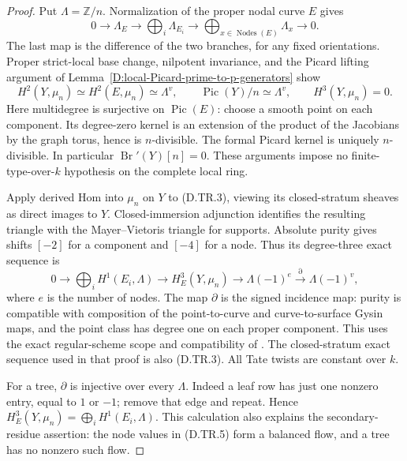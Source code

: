 \begin{proof}
Put $\Lambda=\mathbb Z/n$. Normalization of the proper
nodal curve $E$ gives
\[
 0\longrightarrow\Lambda_E\longrightarrow
   \bigoplus_i\Lambda_{E_i}\longrightarrow
   \bigoplus_{x\in\operatorname{Nodes}(E)}\Lambda_x
   \longrightarrow0.                                  \tag{D.TR.3}
\]
The last map is the difference of the two branches, for
any fixed orientations. Proper strict-local base change,
nilpotent invariance, and the Picard lifting argument of
Lemma~\ref{D:local-Picard-prime-to-p-generators} show
\[
 H^2(Y,\mu_n)\simeq H^2(E,\mu_n)\simeq\Lambda^v,
 \qquad \operatorname{Pic}(Y)/n\simeq\Lambda^v,
 \qquad H^3(Y,\mu_n)=0.                               \tag{D.TR.4}
\]
Here multidegree is surjective on $\operatorname{Pic}(E)$:
choose a smooth point on each component. Its degree-zero
kernel is an extension of the product of the Jacobians by
the graph torus, hence is $n$-divisible. The formal Picard
kernel is uniquely $n$-divisible. In particular
$\operatorname{Br}'(Y)[n]=0$. These arguments impose no
finite-type-over-$k$ hypothesis on the complete local ring.

Apply derived Hom into $\mu_n$ on $Y$ to (D.TR.3),
viewing its closed-stratum sheaves as direct images to $Y$.
Closed-immersion adjunction identifies the resulting
triangle with the Mayer--Vietoris triangle for supports.
Absolute purity gives shifts $[-2]$ for a component and
$[-4]$ for a node. Thus its degree-three exact sequence is
\[
 0\longrightarrow\bigoplus_i H^1(E_i,\Lambda)
 \longrightarrow H^3_E(Y,\mu_n)
 \longrightarrow\Lambda(-1)^{e}
       \xrightarrow{\partial}\Lambda(-1)^v,            \tag{D.TR.5}
\]
where $e$ is the number of nodes. The map $\partial$ is
the signed incidence map: purity is compatible with
composition of the point-to-curve and curve-to-surface
Gysin maps, and the point class has degree one on each
proper component. This uses the exact regular-scheme
scope and compatibility of \citet[Expose XVI, Sections2--3,
Theorem3.1.1 and the proof of Corollary3.1.3]{A_ILO2014}.
The closed-stratum exact sequence used in that proof is
also (D.TR.3). All Tate twists are constant over $k$.

For a tree, $\partial$ is injective over every $\Lambda$.
Indeed a leaf row has just one nonzero entry, equal to
$1$ or $-1$; remove that edge and repeat. Hence
$H^3_E(Y,\mu_n)=\bigoplus_i H^1(E_i,\Lambda)$.
This calculation also explains the secondary-residue
assertion: the node values in (D.TR.5) form a balanced
flow, and a tree has no nonzero such flow.


\end{proof}
